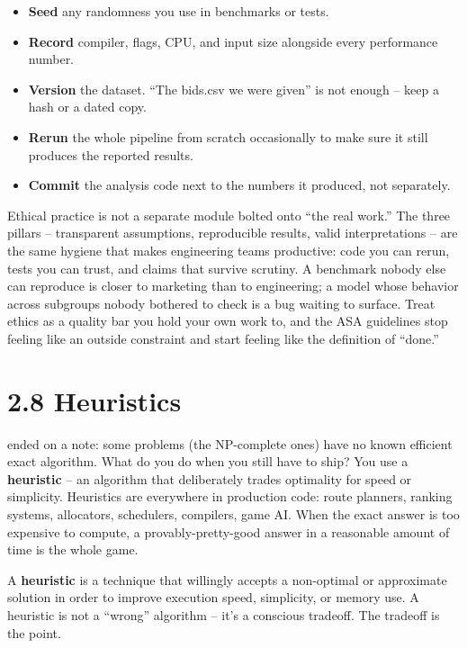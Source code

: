 \documentclass[11pt]{article}
\begin{document}
\begin{itemize}[leftmargin=*,noitemsep]
    \item \textbf{Seed} any randomness you use in benchmarks or tests.
    \item \textbf{Record} compiler, flags, CPU, and input size alongside
          every performance number.
    \item \textbf{Version} the dataset. ``The bids.csv we were given''
          is not enough -- keep a hash or a dated copy.
    \item \textbf{Rerun} the whole pipeline from scratch occasionally
          to make sure it still produces the reported results.
    \item \textbf{Commit} the analysis code next to the numbers it
          produced, not separately.
\end{itemize}

\begin{ideabox}
Ethical practice is not a separate module bolted onto ``the real
work.'' The three pillars -- transparent assumptions, reproducible
results, valid interpretations -- are the same hygiene that makes
engineering teams productive: code you can rerun, tests you can
trust, and claims that survive scrutiny. A benchmark nobody else
can reproduce is closer to marketing than to engineering; a model
whose behavior across subgroups nobody bothered to check is a bug
waiting to surface. Treat ethics as a quality bar you hold your own
work to, and the ASA guidelines stop feeling like an outside
constraint and start feeling like the definition of ``done.''
\end{ideabox}

\section{2.8 Heuristics}

 ended on a note: some problems (the NP-complete ones)
have no known efficient exact algorithm. What do you do when you still
have to ship? You use a \textbf{heuristic} -- an algorithm that
deliberately trades optimality for speed or simplicity. Heuristics
are everywhere in production code: route planners, ranking systems,
allocators, schedulers, compilers, game AI. When the exact answer is
too expensive to compute, a provably-pretty-good answer in a
reasonable amount of time is the whole game.

\begin{defnbox}[Heuristic]
A \textbf{heuristic} is a technique that willingly accepts a
non-optimal or approximate solution in order to improve execution
speed, simplicity, or memory use. A heuristic is not a
``wrong'' algorithm -- it's a conscious tradeoff. The tradeoff is the
point.
\end{defnbox}
\end{document}
